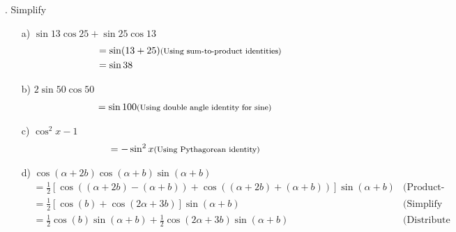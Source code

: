 \documentclass{article}
\newenvironment{solution}{\color{solutioncolor}}{}
\newcommand{\smalltext}[1]{\text{\footnotesize #1}}
\begin{document}
. Simplify
\begin{enumerate}
    \item[a)] \( \sin 13 \cos 25 + \sin 25 \cos 13 \)
    \begin{solution}
    \begin{align*}
        &= \sin(13 + 25) \smalltext{ (Using sum-to-product identities)} \\
        &= \sin 38
    \end{align*}
    \end{solution}

    \item[b)] \( 2\sin 50 \cos 50 \)
    \begin{solution}
    \begin{align*}
        &= \sin 100 \smalltext{ (Using double angle identity for sine)}
    \end{align*}
    \end{solution}

    \item[c)] \( \cos^2 x - 1 \)
    \begin{solution}
    \begin{align*}
        &= -\sin^2 x \smalltext{ (Using Pythagorean identity)}
    \end{align*}
    \end{solution}

    \item[d)] \( \cos(\alpha + 2b) \cos(\alpha + b) \sin(\alpha + b) \)
\begin{solution}
    \begin{align*}
&= \frac{1}{2}[\cos((\alpha + 2b) - (\alpha + b)) + \cos((\alpha + 2b) + (\alpha + b))] \sin(\alpha + b) & \text{(Product-to-sum identity)} \\
&= \frac{1}{2}[\cos(b) + \cos(2\alpha + 3b)] \sin(\alpha + b) & \text{(Simplify the cosine arguments)} \\
&= \frac{1}{2}\cos(b)\sin(\alpha + b) + \frac{1}{2}\cos(2\alpha + 3b)\sin(\alpha + b) & \text{(Distribute the sine term)}
\end{align*}

    \end{solution}
\end{enumerate}
\end{document}
